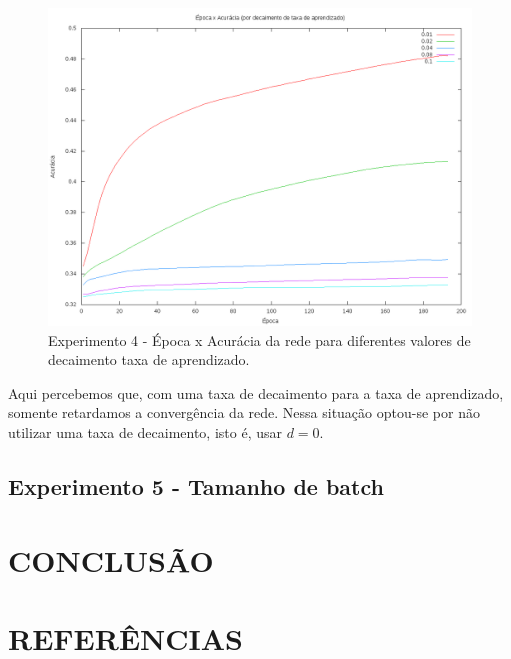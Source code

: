 \documentclass[12pt]{article}
\begin{document}
\begin{figure}[h]
  \centering
  \includegraphics[width=1\textwidth]{../tests/4-lrdecay/graph.png}
  \caption{Experimento 4 - Época x Acurácia da rede para diferentes
  valores de decaimento taxa de aprendizado.}
  \label{fig:exp4}
\end{figure}

Aqui percebemos que, com uma taxa de decaimento para a taxa de
aprendizado, somente retardamos a convergência da rede. Nessa situação
optou-se por não utilizar uma taxa de decaimento, isto é, usar
$ d = 0 $.

\subsection{Experimento 5 - Tamanho de batch}



\section{CONCLUSÃO}



\section{REFERÊNCIAS}



\end{document}
